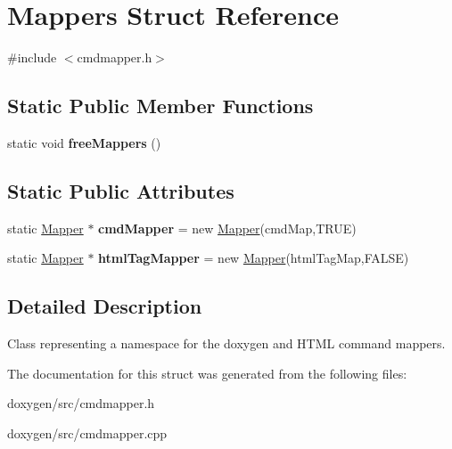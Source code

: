 \hypertarget{struct_mappers}{}\section{Mappers Struct Reference}
\label{struct_mappers}


{\ttfamily \#include $<$cmdmapper.\+h$>$}

\subsection*{Static Public Member Functions}
\begin{DoxyCompactItemize}
\item 
\mbox{\label{struct_mappers_aa2ba9c5371b148a67f2dbd2f85620968}} 
static void {\bfseries free\+Mappers} ()
\end{DoxyCompactItemize}
\subsection*{Static Public Attributes}
\begin{DoxyCompactItemize}
\item 
\mbox{\label{struct_mappers_a7f535b1382d0320d5ad22b75386da706}} 
static \mbox{\hyperlink{class_mapper}{Mapper}} $\ast$ {\bfseries cmd\+Mapper} = new \mbox{\hyperlink{class_mapper}{Mapper}}(cmd\+Map,T\+R\+UE)
\item 
\mbox{\label{struct_mappers_abeeec7950ae00f874c06bee2f04337ff}} 
static \mbox{\hyperlink{class_mapper}{Mapper}} $\ast$ {\bfseries html\+Tag\+Mapper} = new \mbox{\hyperlink{class_mapper}{Mapper}}(html\+Tag\+Map,F\+A\+L\+SE)
\end{DoxyCompactItemize}


\subsection{Detailed Description}
Class representing a namespace for the doxygen and H\+T\+ML command mappers. 

The documentation for this struct was generated from the following files\+:\begin{DoxyCompactItemize}
\item 
doxygen/src/cmdmapper.\+h\item 
doxygen/src/cmdmapper.\+cpp\end{DoxyCompactItemize}
